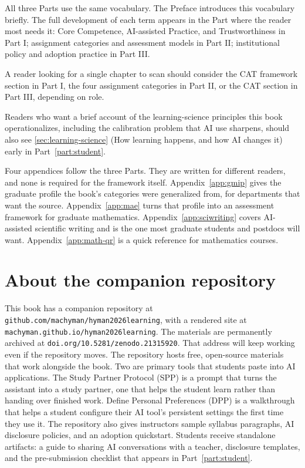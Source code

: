 \documentclass{SIAMbook2023}
\begin{document}
All three Parts use the same vocabulary. The Preface introduces this vocabulary briefly. The full development of each term appears in the Part where the reader most needs it: Core Competence, AI-assisted Practice, and Trustworthiness in Part I; assignment categories and assessment models in Part II; institutional policy and adoption practice in Part III.

A reader looking for a single chapter to scan should consider the CAT framework section in Part I, the four assignment categories in Part II, or the CAT section in Part III, depending on role.

Readers who want a brief account of the learning-science principles this book operationalizes, including the calibration problem that AI use sharpens, should also see \cref{sec:learning-science} (How learning happens, and how AI changes it) early in Part~\ref{part:student}.


Four appendices follow the three Parts. They are written for different readers, and none is required for the framework itself. Appendix~\ref{app:gmip} gives the graduate profile the book's categories were generalized from, for departments that want the source. Appendix~\ref{app:mae} turns that profile into an assessment framework for graduate mathematics. Appendix~\ref{app:sciwriting} covers AI-assisted scientific writing and is the one most graduate students and postdocs will want. Appendix~\ref{app:math-qr} is a quick reference for mathematics courses.

\section*{About the companion repository}

This book has a companion repository at \texttt{github.com/machyman/hyman2026learning}, with a rendered site at \texttt{machyman.github.io/hyman2026learning}. The materials are permanently archived at \texttt{doi.org/10.5281/zenodo.21315920}. That address will keep working even if the repository moves. The repository hosts free, open-source materials that work alongside the book. Two are primary tools that students paste into AI applications. The Study Partner Protocol (SPP) is a prompt that turns the assistant into a study partner, one that helps the student learn rather than handing over finished work. Define Personal Preferences (DPP) is a walkthrough that helps a student configure their AI tool's persistent settings the first time they use it. The repository also gives instructors sample syllabus paragraphs, AI disclosure policies, and an adoption quickstart. Students receive standalone artifacts: a guide to sharing AI conversations with a teacher, disclosure templates, and the pre-submission checklist that appears in Part~\ref{part:student}.
\end{document}
